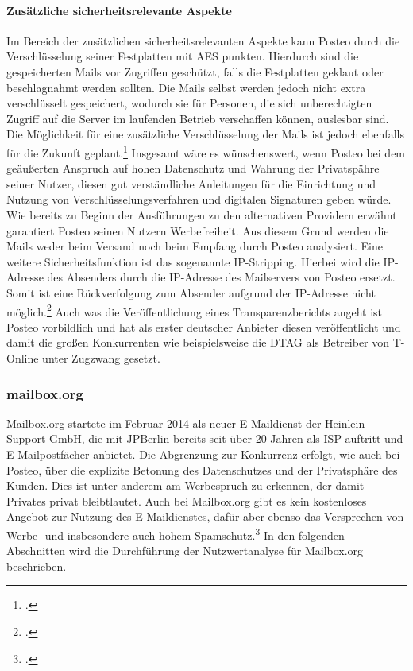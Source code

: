 \documentclass  [paper=a4,
				fontsize=12pt,
				listof=totoc,
				bibliography=totoc
				]{scrreprt}
\begin{document}
					\paragraph{Zusätzliche sicherheitsrelevante Aspekte}
						Im Bereich der zusätzlichen sicherheitsrelevanten Aspekte kann Posteo durch die Verschlüsselung seiner Festplatten mit \ac{AES} punkten.
						Hierdurch sind die gespeicherten Mails vor Zugriffen geschützt, falls die Festplatten geklaut oder beschlagnahmt werden sollten.
						Die Mails selbst werden jedoch nicht extra verschlüsselt gespeichert, wodurch sie für Personen, die sich unberechtigten Zugriff auf die Server im laufenden Betrieb verschaffen können, auslesbar sind.
						Die Möglichkeit für eine zusätzliche Verschlüsselung der Mails ist jedoch ebenfalls für die Zukunft geplant.\footcite[Vgl.][]{Posteo2013c}
						Insgesamt wäre es wünschenswert, wenn Posteo bei dem geäußerten Anspruch auf hohen Datenschutz und Wahrung der Privatspähre seiner Nutzer, diesen gut verständliche Anleitungen für die Einrichtung und Nutzung von Verschlüsselungsverfahren und digitalen Signaturen geben würde.
						Wie bereits zu Beginn der Ausführungen zu den alternativen Providern erwähnt garantiert Posteo seinen Nutzern Werbefreiheit.
						Aus diesem Grund werden die Mails weder beim Versand noch beim Empfang durch Posteo analysiert.
						Eine weitere Sicherheitsfunktion ist das sogenannte \ac{IP}-Stripping.
						Hierbei wird die \ac{IP}-Adresse des Absenders durch die \ac{IP}-Adresse des Mailservers von Posteo ersetzt.
						Somit ist eine Rückverfolgung zum Absender aufgrund der \ac{IP}-Adresse nicht möglich.\footcite[Vgl.][]{Posteo2013a}
						Auch was die Veröffentlichung eines Transparenzberichts angeht ist Posteo vorbildlich und hat als erster deutscher Anbieter diesen veröffentlicht und damit die großen Konkurrenten wie beispielsweise die \ac{DTAG} als Betreiber von T-Online unter Zugzwang gesetzt.
					
					
				\subsubsection{mailbox.org}
				\label{subsubsec:mailbox}
					Mailbox.org startete im Februar 2014 als neuer E-Maildienst der Heinlein Support GmbH, die mit JPBerlin bereits seit über 20 Jahren als \ac{ISP} auftritt und E-Mailpostfächer anbietet.
					Die Abgrenzung zur Konkurrenz erfolgt, wie auch bei Posteo, über die explizite Betonung des Datenschutzes und der Privatsphäre des Kunden.
					Dies ist unter anderem am Werbespruch zu erkennen, der \glqq damit Privates privat bleibt\grqq lautet.
					Auch bei Mailbox.org gibt es kein kostenloses Angebot zur Nutzung des E-Maildienstes, dafür aber ebenso das Versprechen von Werbe- und insbesondere auch hohem Spamschutz.\footcite[Vgl.][]{Mailbox2014}
					In den folgenden Abschnitten wird die Durchführung der Nutzwertanalyse für Mailbox.org beschrieben.
					
\end{document}
